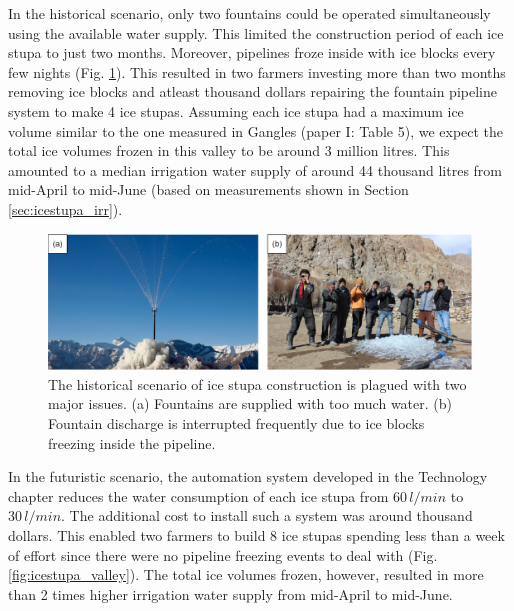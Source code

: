 
In the historical scenario, only two fountains could be operated simultaneously using the available water
supply. This limited the construction period of each ice stupa to just two months. Moreover, pipelines froze
inside with ice blocks every few nights (Fig. \ref{fig:issues}). This resulted in two farmers investing more
than two months removing ice blocks and atleast thousand dollars repairing the fountain pipeline system to make
4 ice stupas. Assuming each ice stupa had a maximum ice volume similar to the one measured in Gangles (paper I:
Table 5), we expect the total ice volumes frozen in this valley to be around 3 million litres. This amounted to
a median irrigation water supply of around 44 thousand litres from mid-April to mid-June (based on measurements
shown in Section \ref{sec:icestupa_irr}).   

\begin{figure}[htb]
	\includegraphics[width=\textwidth]{figs/construction_issues}

  \caption{The historical scenario of ice stupa construction is plagued with two major issues. (a) Fountains are
  supplied with too much water. (b) Fountain discharge is interrupted frequently due to ice blocks freezing
  inside the pipeline.}

	\label{fig:issues}
\end{figure}


In the futuristic scenario, the automation system developed in the Technology chapter reduces the water
consumption of each ice stupa from $60\,l/min$ to $30\,l/min$. The additional cost to install such a system was
around thousand dollars. This enabled two farmers to build 8 ice stupas spending less than a week of effort
since there were no pipeline freezing events to deal with (Fig. \ref{fig:icestupa_valley}). The total ice
volumes frozen, however, resulted in more than 2 times higher irrigation water supply from mid-April to
mid-June.


